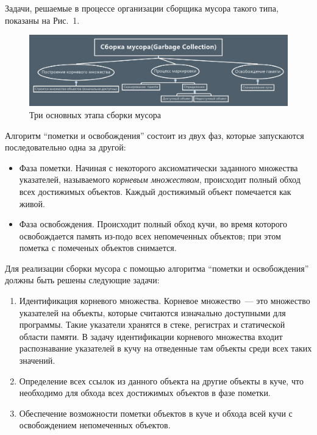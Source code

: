 Задачи, решаемые в процессе организации сборщика мусора такого типа, показаны на Рис.~1.

\begin{figure}[h!]
	\centering
	\includegraphics[width=500pt]{Kren/picture1.jpg}
	\caption{Три основных этапа сборки мусора}
	\centering
\end{figure}

Алгоритм ``пометки и освобождения'' состоит из двух фаз, которые запускаются последовательно
одна за другой:

\begin{itemize}
\item Фаза пометки. Начиная с некоторого аксиоматически заданного множества указателей, называемого
\emph{корневым множеством}, происходит полный обход всех достижимых объектов. Каждый достижимый
объект помечается как живой.
\item Фаза освобождения. Происходит полный обход кучи, во время которого освобождается память
из-подо всех непомеченных объектов; при этом пометка с помеченых объектов снимается.
\end{itemize}

Для реализации сборки мусора с помощью алгоритма ``пометки и освобождения'' должны быть решены
следующие задачи:

\begin{enumerate}
\item Идентификация корневого множества. Корневое множество~--- это множество указателей на
объекты, которые считаются изначально доступными для программы. Такие указатели хранятся в
стеке, регистрах и статической области памяти. В задачу идентификации корневого множества 
входит распознавание указателей в кучу на отведенные там объекты среди всех таких значений.

\item Определение всех ссылок из данного объекта на другие объекты в куче, что необходимо для
обхода всех достижимых объектов в фазе пометки.

\item Обеспечение возможности пометки объектов в куче и обхода всей кучи с освобождением 
непомеченных объектов.
\end{enumerate}

